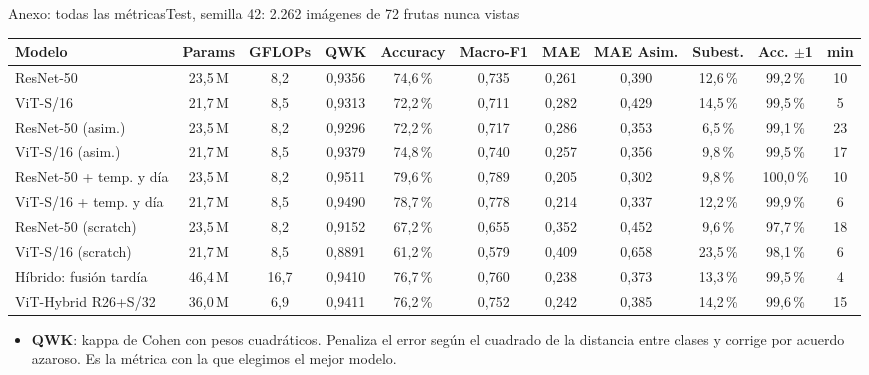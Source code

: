 \documentclass[aspectratio=169,11pt,table]{beamer}
\begin{document}
\begin{frame}{Anexo: todas las métricas}{Test, semilla 42: 2.262 imágenes de 72 frutas nunca vistas}
{\tiny
\centering
\begin{tabular}{lcccccccccc}
\toprule
\rowcolor{verdeosc}\color{white}\bfseries Modelo & \color{white}\bfseries Params & \color{white}\bfseries GFLOPs & \color{white}\bfseries QWK & \color{white}\bfseries Accuracy & \color{white}\bfseries Macro-F1 & \color{white}\bfseries MAE & \color{white}\bfseries MAE Asim. & \color{white}\bfseries Subest. & \color{white}\bfseries Acc. $\pm$1 & \color{white}\bfseries min \\
\midrule
ResNet-50 & 23{,}5\,M & 8{,}2 & 0{,}9356 & 74{,}6\,\% & 0{,}735 & 0{,}261 & 0{,}390 & 12{,}6\,\% & 99{,}2\,\% & 10 \\
ViT-S/16 & 21{,}7\,M & 8{,}5 & 0{,}9313 & 72{,}2\,\% & 0{,}711 & 0{,}282 & 0{,}429 & 14{,}5\,\% & 99{,}5\,\% & 5 \\
ResNet-50 (asim.) & 23{,}5\,M & 8{,}2 & 0{,}9296 & 72{,}2\,\% & 0{,}717 & 0{,}286 & 0{,}353 & 6{,}5\,\% & 99{,}1\,\% & 23 \\
ViT-S/16 (asim.) & 21{,}7\,M & 8{,}5 & 0{,}9379 & 74{,}8\,\% & 0{,}740 & 0{,}257 & 0{,}356 & 9{,}8\,\% & 99{,}5\,\% & 17 \\
ResNet-50 + temp. y día & 23{,}5\,M & 8{,}2 & 0{,}9511 & 79{,}6\,\% & 0{,}789 & 0{,}205 & 0{,}302 & 9{,}8\,\% & 100{,}0\,\% & 10 \\
ViT-S/16 + temp. y día & 21{,}7\,M & 8{,}5 & 0{,}9490 & 78{,}7\,\% & 0{,}778 & 0{,}214 & 0{,}337 & 12{,}2\,\% & 99{,}9\,\% & 6 \\
ResNet-50 (scratch) & 23{,}5\,M & 8{,}2 & 0{,}9152 & 67{,}2\,\% & 0{,}655 & 0{,}352 & 0{,}452 & 9{,}6\,\% & 97{,}7\,\% & 18 \\
ViT-S/16 (scratch) & 21{,}7\,M & 8{,}5 & 0{,}8891 & 61{,}2\,\% & 0{,}579 & 0{,}409 & 0{,}658 & 23{,}5\,\% & 98{,}1\,\% & 6 \\
Híbrido: fusión tardía & 46{,}4\,M & 16{,}7 & 0{,}9410 & 76{,}7\,\% & 0{,}760 & 0{,}238 & 0{,}373 & 13{,}3\,\% & 99{,}5\,\% & 4 \\
ViT-Hybrid R26+S/32 & 36{,}0\,M & 6{,}9 & 0{,}9411 & 76{,}2\,\% & 0{,}752 & 0{,}242 & 0{,}385 & 14{,}2\,\% & 99{,}6\,\% & 15 \\
\bottomrule
\end{tabular}
}
\vspace{0.4em}
{\tiny
\setlength{\itemsep}{0.14em}
\begin{itemize}
  \item \textbf{QWK}: kappa de Cohen con pesos cuadráticos. Penaliza el error según el cuadrado de la distancia entre clases y corrige por acuerdo azaroso. Es la métrica con la que elegimos el mejor modelo.

\end{itemize}}
\end{frame}
\end{document}

